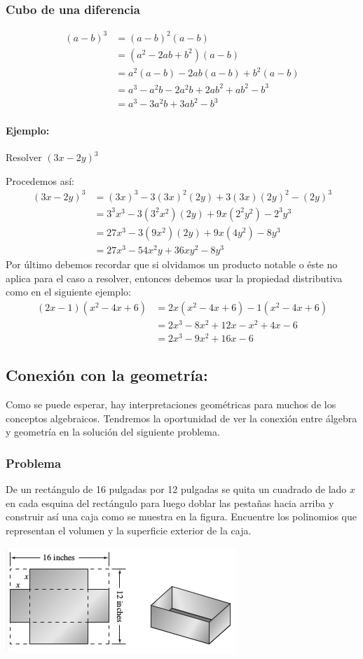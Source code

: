 \documentclass[10pt,twoside]{article}
\begin{document}
\subsubsection*{Cubo de una diferencia}
\begin{align*}
(a-b)^3&=(a-b)^2(a-b)\\
&=(a^2-2ab+b^2)(a-b)\\
&=a^2(a-b)-2ab(a-b)+b^2(a-b)\\
&=a^3-a^2b-2a^2b+2ab^2+ab^2-b^3\\
&=a^3-3a^2b+3ab^2-b^3
\end{align*}
\paragraph*{Ejemplo:}

Resolver $(3x-2y)^3$

Procedemos así:
\begin{align*}
(3x-2y)^3&=(3x)^3-3(3x)^2(2y)+3(3x)(2y)^2-(2y)^3\\
&=3^3x^3-3(3^2x^2)(2y)+9x(2^2y^2)-2^3y^3\\
&=27x^3-3(9x^2)(2y)+9x(4y^2)-8y^3\\
&=27x^3-54x^2y+36xy^2-8y^3
\end{align*}
Por último debemos recordar que si olvidamos un producto notable o éste no aplica para el caso a resolver, entonces debemos usar la propiedad distributiva como en el siguiente ejemplo:
\begin{align*}
(2x-1)(x^2-4x+6)&=2x(x^2-4x+6)-1(x^2-4x+6)\\
&=2x^3-8x^2+12x-x^2+4x-6\\
&=2x^3-9x^2+16x-6
\end{align*}
\subsection*{Conexión con la geometr\'{i}a:}
Como se puede esperar, hay interpretaciones geométricas para muchos de los conceptos algebraicos. Tendremos la oportunidad de ver la conexión entre álgebra y geometría en la solución del siguiente problema.
\subsubsection*{Problema}
De un rectángulo de 16 pulgadas por 12 pulgadas se quita un cuadrado de lado $x$ en cada esquina del rectángulo para luego doblar las pestañas hacia arriba y construir así una caja como se muestra en la figura. Encuentre los polinomios que representan el volumen y la superficie exterior de la caja.
\begin{center}
\includegraphics[scale=.75]{Images/caja_12in.png} 
\end{center}
\end{document}
